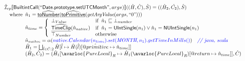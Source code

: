 \[\begin{array}{l}
\aI _{cp}\lbr \SF{BuiltintCall}(``\SF{Date.prototype.setUTCMonth}",args_{})\rbr((\hat{H},\hat{C}), \hat{S})
  = ((\hat{H}_2, \hat{C_2}), \hat{S})\\
\quad\wherec{
  \hat{n}_{1} = \ahf{toNumber}(\ahf{toPrimitive}(\hf{getArgValue}(args, ``0")))\\
  \hat{n}_{time} = \left\{\begin{array}{ll}
      \bot_{Value} & \ifc{\hat{n}_{1} \sqsubseteq  \bot_{number}}\\
      \ahf{TimeClip}(\hat{n}_{native})
      & \ifc{\hat{n}_{1} = \SF{UIntSingle}(n_{1}) \lor \hat{n}_{1} = \SF{NUIntSingle}(n_{1}) }\\
      \top_{Number} & \owc
    \end{array}\right.\\
  \hat{n}_{naitve} = \alpha({\inblue native.Calendar(n_{time}).set(\emph{MONTH}, n_{1}).getTimeInMills()})
    \quad\comment{{\inblue // java, scala}}\\  
  \hat{H}_1 = \bigsqcup_{\hat{l} \in \hat{C}.2} \hat{H}[\hat{l}
    \mapsto \hat{H}(\hat{l})[\avarprop{primitive} \mapsto \hat{n}_{time}]]\\
  (\hat{H}_2, \hat{C}_2) = 
    (\hat{H}_1[\avarloc{PureLocal}_R \mapsto \hat{H}_1(\avarloc{PureLocal}_R)
      [\varprop{return} \mapsto \hat{n}_{time}]], \hat{C})\\
  }\\
\\\\
\end{array}
\]
